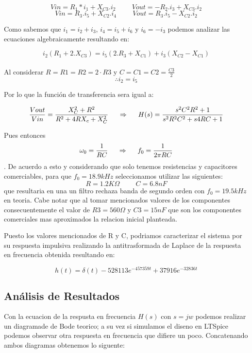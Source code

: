 $$Vin = R_1 *i_1 + X_{C3}.i_2 \hspace{1cm} Vout = -R_2 .i_3 + X_{C3}.i_2$$
$$Vin = R_3 .i_5 + X_{C2}.i_4 \hspace{1cm} Vout = R_3 .i_5 - X_{C2}.i_2$$

Como sabemos que $i_1 = i_2 + i_3$, $i_4 = i_5 + i_6$ y $i_6 = - i_3$ podemos analizar las ecuaciones algebraicamente resultando en:

$$i_2 (R_1 + 2.X_{C3}) = i_5 (2.R_3+X_{C1}) + i_3 (X_{C2} - X_{C1})$$\\


Al considerar $R = R1 = R2 = 2 \cdot R3$ y $C = C1 = C2 = \frac{C3}{2}$ 
$$\therefore i_2 = i_5$$

Por lo que la función de transferencia sera igual a:

$$\frac{Vout}{Vin} = \frac{X_C^2 + R^2}{R^2 + 4RX_c + X_C^2} \hspace{0.5cm}\Rightarrow \hspace{0.5cm} H(s) = \frac{s^2C^2R^2 + 1}{s^2R^2C^2 + s4RC + 1}$$

Pues entonces $$\omega_0 = \frac{1}{RC} \hspace{0.5cm} \Rightarrow \hspace{0.5cm} f_0 = \frac{1}{2\pi RC}$$. De acuerdo a esto y considerando que solo tenemos resistencias y capacitores comerciables, para que $f_0 = 18.9kHz$ seleccionamos utilizar las siguientes:
$$R = 1.2K\Omega \hspace{1cm} C = 6.8nF$$ que resultaria en una un filtro rechaza banda de segundo orden con $f_0 = 19.5kHz$ en teoria. Cabe notar que al tomar mencionados valores de los componentes consecuentemente el valor de $R3 = 560\Omega$ y $C3 = 15nF$ que son los componentes comerciales mas aproximados la relacion inicial planteada.

Puesto los valores mencionados de R y C, podriamos caracterizar el sistema por su respuesta impulsiva realizando la antitrasformada de Laplace de la respuesta en frecuencia obtenida resultando en:

$$h(t) = \delta (t) - 528113e^{-457359t} + 37916e^{-32836t}$$

\subsection{Análisis de Resultados}

Con la ecuacion de la respusta en frecuencia $H(s)$ con $s=jw$ podemos realizar un diagramade de Bode teorico; a su vez si simulamos el diseno en LTSpice podemos observar otra respuesta en frecuencia que difiere un poco. Concatenando ambos diagramas obtenemos lo siguente:


